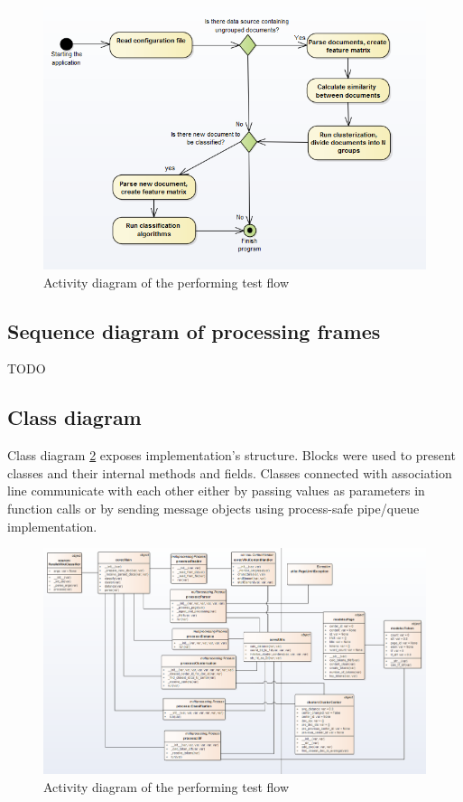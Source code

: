 \begin{figure}[H]
	\begin{center}
		\includegraphics[width=1.0\linewidth]{images/diagrams/activity.PNG}
		\caption{Activity diagram of the performing test flow}
		\label{design-activity-diagram}
	\end{center}
\end{figure}


\subsection{Sequence diagram of processing frames}
TODO



\subsection{Class diagram}
Class diagram \ref{design-class-diagram} exposes implementation's structure. Blocks were used to present classes and their internal methods and fields. Classes connected with association line communicate with each other either by passing values as parameters in function calls or by sending message objects using process-safe pipe/queue implementation. 

\begin{figure}[H]
	\begin{center}
		\includegraphics[width=1.0\linewidth]{images/diagrams/class.png}
		\caption{Activity diagram of the performing test flow}
		\label{design-class-diagram}
	\end{center}
\end{figure}

